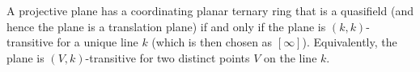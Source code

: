 A projective plane has a coordinating planar ternary ring that is a quasifield (and hence the plane is a translation plane) if and only if the plane is $(k,k)$-transitive for a unique line $k$ (which is then chosen as $[\infty]$). Equivalently, the plane is $(V,k)$-transitive for two distinct points $V$ on the line $k$.
